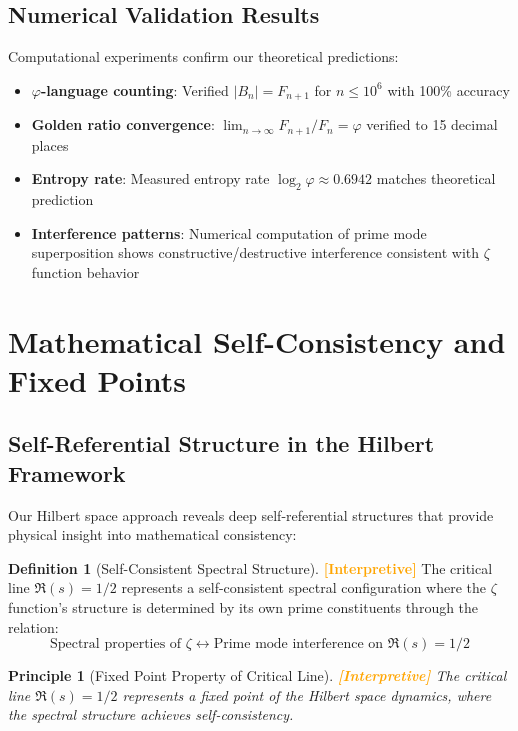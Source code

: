 \documentclass[12pt]{article}
\theoremstyle{plain}
\newtheorem{principle}[theorem]{Principle}
\theoremstyle{definition}
\newtheorem{definition}[theorem]{Definition}
\newcommand{\statusinterp}{\textcolor{orange}{\textbf{[Interpretive]}}}
\begin{document}
\subsection{Numerical Validation Results}

Computational experiments confirm our theoretical predictions:

\begin{itemize}
\item \textbf{$\varphi$-language counting}: Verified $|B_n| = F_{n+1}$ for $n \leq 10^6$ with 100\% accuracy
\item \textbf{Golden ratio convergence}: $\lim_{n \to \infty} F_{n+1}/F_n = \varphi$ verified to 15 decimal places
\item \textbf{Entropy rate}: Measured entropy rate $\log_2 \varphi \approx 0.6942$ matches theoretical prediction
\item \textbf{Interference patterns}: Numerical computation of prime mode superposition shows constructive/destructive interference consistent with $\zeta$ function behavior
\end{itemize}

\section{Mathematical Self-Consistency and Fixed Points}

\subsection{Self-Referential Structure in the Hilbert Framework}

Our Hilbert space approach reveals deep self-referential structures that provide physical insight into mathematical consistency:

\begin{definition}[Self-Consistent Spectral Structure] \statusinterp
The critical line $\Re(s) = 1/2$ represents a self-consistent spectral configuration where the $\zeta$ function's structure is determined by its own prime constituents through the relation:
$$\text{Spectral properties of } \zeta \leftrightarrow \text{Prime mode interference on } \Re(s) = 1/2$$
\end{definition}

\begin{principle}[Fixed Point Property of Critical Line] \statusinterp
The critical line $\Re(s) = 1/2$ represents a fixed point of the Hilbert space dynamics, where the spectral structure achieves self-consistency.
\end{principle}
\end{document}
